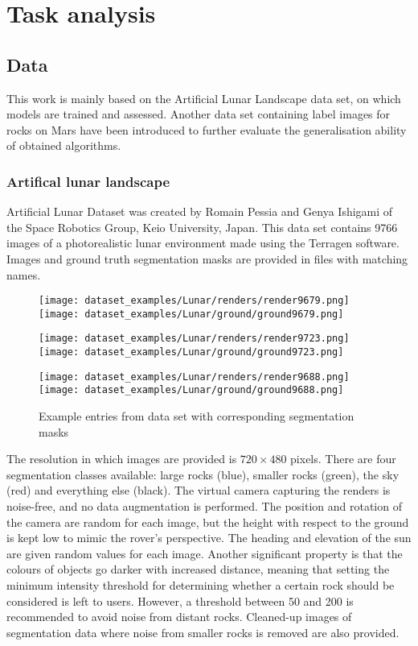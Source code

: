 \documentclass[a4paper,twoside,12pt]{book}
\begin{document}
\chapter{Task analysis}
\label{sec:chapter2}

\section{Data}
\label{sec:chapter2.1}
This work is mainly based on the Artificial Lunar Landscape data set, on which models are trained and assessed. Another data set containing label images for rocks on Mars have been introduced to further evaluate the generalisation ability of obtained algorithms.

\subsection{Artifical lunar landscape}
\label{sec:chapter2.1.1}
Artificial Lunar Dataset was created by Romain Pessia and Genya Ishigami of the Space Robotics Group, Keio University, Japan. This data set contains 9766 images of a photorealistic lunar environment made using the Terragen software. Images and ground truth segmentation masks are provided in files with matching names.

\begin{figure}[ht!]
    \centering
    \texttt{[image: dataset\_examples/Lunar/renders/render9679.png]}
    \texttt{[image: dataset\_examples/Lunar/ground/ground9679.png]}

    \texttt{[image: dataset\_examples/Lunar/renders/render9723.png]}
    \texttt{[image: dataset\_examples/Lunar/ground/ground9723.png]}

    \texttt{[image: dataset\_examples/Lunar/renders/render9688.png]}
    \texttt{[image: dataset\_examples/Lunar/ground/ground9688.png]}
    \caption{Example entries from data set with corresponding segmentation masks}
    \label{fig:data_example1}
\end{figure}

The resolution in which images are provided is $720 \times 480$ pixels. There are four segmentation classes available: large rocks (blue), smaller rocks (green), the sky (red) and everything else (black). The virtual camera capturing the renders is noise-free, and no data augmentation is performed. The position and rotation of the camera are random for each image, but the height with respect to the ground is kept low to mimic the rover's perspective. The heading and elevation of the sun are given random values for each image. Another significant property is that the colours of objects go darker with increased distance, meaning that setting the minimum intensity threshold for determining whether a certain rock should be considered is left to users. However, a threshold between 50 and 200 is recommended to avoid noise from distant rocks. Cleaned-up images of segmentation data where noise from smaller rocks is removed are also provided.
\end{document}
